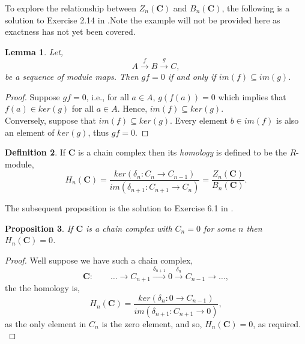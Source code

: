 \documentclass[11.5pt, twoside, a4paper, titlepage]{report}
\theoremstyle{definition}
\newtheorem{mydef}{Definition}[section]
\theoremstyle{plain}
\newtheorem{lem}[mydef]{Lemma}
\newtheorem{prop}[mydef]{Proposition}
\begin{document}
To explore the relationship between $Z_n(\mathbf{C})$ and $B_n(\mathbf{C})$, the following is a solution to Exercise 2.14 in \cite{Rotman}.Note the example will not be provided here as exactness has not yet been covered.

\begin{lem}\label{iminkerlem}
Let,
\begin{equation*}
A \xrightarrow{f} B \xrightarrow{g} C,
\end{equation*}
be a sequence of module maps. Then $gf=0$ if and only if $im(f)\subseteq im(g)$.
\end{lem}
\begin{proof}
Suppose $gf=0$, i.e., for all $a\in A$, $g(f(a))=0$ which implies that $f(a)\in ker(g)$ for all $a \in A$. Hence, $im(f) \subseteq ker(g)$.\\
Conversely, suppose that $im(f) \subseteq ker(g)$. Every element $b\in im(f)$ is also an element of $ker(g)$, thus $gf=0$.
\end{proof}

\begin{mydef} \label{homologydefn}
If $\mathbf{C}$ is a chain complex then its \emph{homology} is defined to be the $R$-module,
\begin{equation*}
H_n(\mathbf{C})=\frac{ker(\delta_n:C_n \rightarrow C_{n-1})}{im(\delta_{n+1}:C_{n+1} \rightarrow C_n)}=\frac{Z_n(\mathbf{C})}{B_n(\mathbf{C})}.
\end{equation*}
\end{mydef}


The subsequent proposition is the solution to Exercise 6.1 in \cite{Rotman}.

\begin{prop}
If $\mathbf{C}$ is a chain complex with $C_n=0$ for some $n$ then $H_n(\mathbf{C})=0$.
\end{prop}
\begin{proof}
Well suppose we have such a chain complex, 
\begin{equation*}
\mathbf{C}: \qquad \dots \xrightarrow{} C_{n+1} \xrightarrow{\delta_{n+1}} 0 \xrightarrow{\delta_n} C_{n-1} \xrightarrow{} \dots,
\end{equation*}
the the homology is,
\begin{equation*}
H_n(\mathbf{C})=\frac{ker(\delta_n: 0 \to C_{n-1})}{im(\delta_{n+1}: C_{n+1}\to 0)},
\end{equation*}
as the only element in $C_n$ is the zero element, and so, $H_n(\mathbf{C})=0$, as required.\\
\end{proof}
\end{document}
